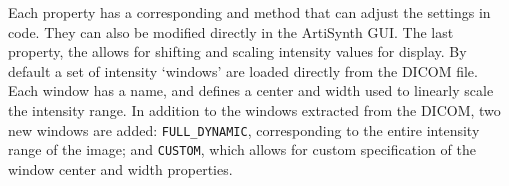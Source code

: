 
Each property has a corresponding  and  method that can
adjust the settings in code.  They can also be modified directly in the ArtiSynth GUI.  The
last property, the  allows for shifting and scaling intensity values for display.  
By default a set of intensity `windows' are loaded directly from the DICOM file.
Each window has a name, and defines a center and width used to linearly scale the intensity range.
In addition to the windows extracted from the DICOM, two new windows are added: 
\texttt{FULL\_DYNAMIC}, corresponding to the entire intensity range of the image; and \texttt{CUSTOM},
which allows for custom specification of the window center and width properties.

